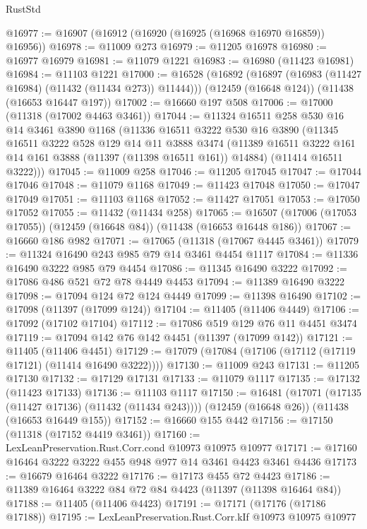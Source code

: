\begin{lexlean}{RustStd}
\begin{coremodule}
@16977 := @16907 (@16912 (@16920 (@16925 (@16968 @16970 @16859)) @16956))
@16978 := @11009 @273
@16979 := @11205 @16978
@16980 := @16977 @16979
@16981 := @11079 @1221
@16983 := @16980 (@11423 @16981)
@16984 := @11103 @1221
@17000 := @16528
    (@16892 (@16897 (@16983 (@11427 @16984) (@11432 (@11434 @273)) @11444)))
    (@12459 (@16648 @124))
    (@11438 (@16653 @16447 @197))
@17002 := @16660 @197 @508
@17006 := @17000 (@11318 (@17002 @4463 @3461))
@17044 := @11324
    @16511
    @258
    @530
    @16
    @14
    @3461
    @3890
    @1168
    (@11336
      @16511
      @3222
      @530
      @16
      @3890
      (@11345
        @16511
        @3222
        @528
        @129
        @14
        @11
        @3888
        @3474
        (@11389 @16511 @3222 @161 @14 @161 @3888 (@11397 (@11398 @16511 @161)) @14884)
        (@11414 @16511 @3222)))
@17045 := @11009 @258
@17046 := @11205 @17045
@17047 := @17044 @17046
@17048 := @11079 @1168
@17049 := @11423 @17048
@17050 := @17047 @17049
@17051 := @11103 @1168
@17052 := @11427 @17051
@17053 := @17050 @17052
@17055 := @11432 (@11434 @258)
@17065 := @16507 (@17006 (@17053 @17055)) (@12459 (@16648 @84)) (@11438 (@16653 @16448 @186))
@17067 := @16660 @186 @982
@17071 := @17065 (@11318 (@17067 @4445 @3461))
@17079 := @11324 @16490 @243 @985 @79 @14 @3461 @4454 @1117
@17084 := @11336 @16490 @3222 @985 @79 @4454
@17086 := @11345 @16490 @3222
@17092 := @17086 @486 @521 @72 @78 @4449 @4453
@17094 := @11389 @16490 @3222
@17098 := @17094 @124 @72 @124 @4449
@17099 := @11398 @16490
@17102 := @17098 (@11397 (@17099 @124))
@17104 := @11405 (@11406 @4449)
@17106 := @17092 (@17102 @17104)
@17112 := @17086 @519 @129 @76 @11 @4451 @3474
@17119 := @17094 @142 @76 @142 @4451 (@11397 (@17099 @142))
@17121 := @11405 (@11406 @4451)
@17129 := @17079 (@17084 (@17106 (@17112 (@17119 @17121) (@11414 @16490 @3222))))
@17130 := @11009 @243
@17131 := @11205 @17130
@17132 := @17129 @17131
@17133 := @11079 @1117
@17135 := @17132 (@11423 @17133)
@17136 := @11103 @1117
@17150 := @16481
    (@17071 (@17135 (@11427 @17136) (@11432 (@11434 @243))))
    (@12459 (@16648 @26))
    (@11438 (@16653 @16449 @155))
@17152 := @16660 @155 @442
@17156 := @17150 (@11318 (@17152 @4419 @3461))
@17160 := LexLeanPreservation.Rust.Corr.cond @10973 @10975 @10977
@17171 := @17160 @16464 @3222 @3222 @455 @948 @977 @14 @3461 @4423 @3461 @4436
@17173 := @16679 @16464 @3222
@17176 := @17173 @455 @72 @4423
@17186 := @11389 @16464 @3222 @84 @72 @84 @4423 (@11397 (@11398 @16464 @84))
@17188 := @11405 (@11406 @4423)
@17191 := @17171 (@17176 (@17186 @17188))
@17195 := LexLeanPreservation.Rust.Corr.kIf @10973 @10975 @10977

\end{coremodule}
\end{lexlean}
